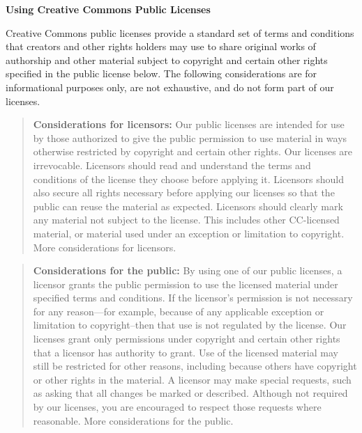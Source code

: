 \par \textbf{Using Creative Commons Public Licenses}
\par Creative Commons public licenses provide a standard set of terms and conditions that creators and other rights holders may use to 
share original works of authorship and other material subject to copyright and certain other rights specified in the public license below. 
The following considerations are for informational purposes only, are not exhaustive, and do not form part of our licenses.
\begin{quotation}\textbf{Considerations for licensors:} Our public licenses are intended for use by those authorized to give the public 
permission to use material in ways otherwise restricted by copyright and certain other rights. Our licenses are irrevocable. Licensors 
should read and understand the terms and conditions of the license they choose before applying it. Licensors should also secure all rights 
necessary before applying our licenses so that the public can reuse the material as expected. Licensors should clearly mark any material 
not subject to the license. This includes other CC-licensed material, or material used under an exception or limitation to copyright. 
More considerations for licensors.\end{quotation}
\begin{quotation}\textbf{Considerations for the public:} By using one of our public licenses, a licensor grants the public permission to 
	use the licensed material under specified terms and conditions. If the licensor’s permission is not necessary for any reason---for 
	example, because of any applicable exception or limitation to copyright–then that use is not regulated by the license. Our licenses 
	grant only permissions under copyright and certain other rights that a licensor has authority to grant. Use of the licensed material 
	may still be restricted for other reasons, including because others have copyright or other rights in the material. A licensor may 
	make special requests, such as asking that all changes be marked or described. Although not required by our licenses, you are 
	encouraged to respect those requests where reasonable.
	More considerations for the public.\end{quotation}
	
